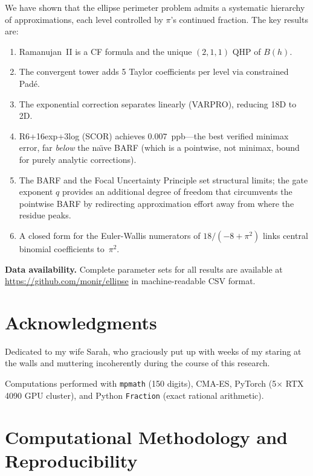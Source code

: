 \documentclass[12pt]{article}
\begin{document}
We have shown that the ellipse perimeter problem admits a systematic hierarchy of approximations, each level controlled by $\pi$'s continued fraction. The key results are:

\begin{enumerate}
\item Ramanujan~II is a CF formula and the unique $(2,1,1)$ QHP of $B(h)$.
\item The convergent tower adds 5 Taylor coefficients per level via constrained Pad\'e.
\item The exponential correction separates linearly (VARPRO), reducing 18D to 2D.
\item R6+16exp+3log (SCOR) achieves $0.007$~ppb---the best verified minimax error, far \emph{below} the na\"{\i}ve BARF (which is a pointwise, not minimax, bound for purely analytic corrections).
\item The BARF and the Focal Uncertainty Principle set structural limits; the gate exponent $q$ provides an additional degree of freedom that circumvents the pointwise BARF by redirecting approximation effort away from where the residue peaks.
\item A closed form for the Euler-Wallis numerators of $18/(-8+\pi^2)$ links central binomial coefficients to~$\pi^2$.
\end{enumerate}

\noindent\textbf{Data availability.} Complete parameter sets for all results are available at \url{https://github.com/monir/ellipse} in machine-readable CSV format.

\section*{Acknowledgments}

Dedicated to my wife Sarah, who graciously put up with weeks of my staring at the walls and muttering incoherently during the course of this research.

\medskip
Computations performed with \texttt{mpmath} (150 digits), CMA-ES, PyTorch (5$\times$ RTX 4090 GPU cluster), and Python \texttt{Fraction} (exact rational arithmetic).

\appendix
\section{Computational Methodology and Reproducibility}\label{app:reproducibility}
\end{document}
